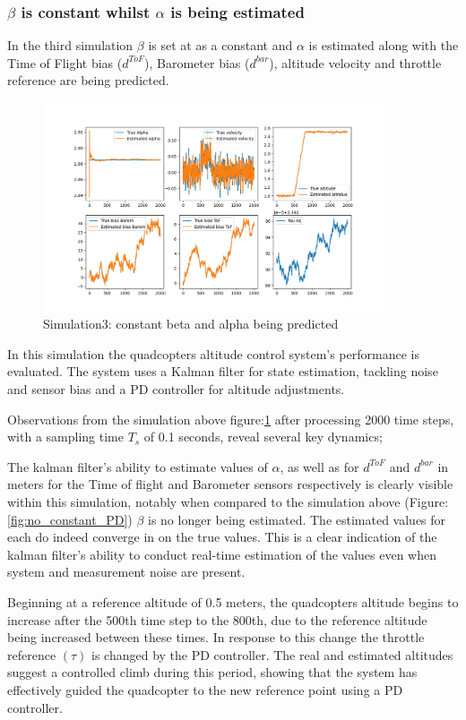 \documentclass{article}
\begin{document}
\subsubsection*{\(\beta\) is constant whilst \(\alpha\) is being estimated}
In the third simulation \(\beta\) is set at as a constant and \(\alpha\) is
estimated along with the Time of Flight bias (\(d^{ToF}\)), Barometer bias
(\(d^{bar}\)), altitude velocity and throttle reference are being predicted.
\begin{figure}[H]
  \centering
  \includegraphics[width=0.9\textwidth]{Pictures/b_constant_PD.png}
  \caption{Simulation3: constant beta and alpha being predicted}
  \label{fig:b_constant_PD}
\end{figure}
In this simulation the quadcopters altitude control system's performance is
evaluated. The system uses a Kalman filter for state estimation, tackling noise
and sensor bias and a PD controller for altitude adjustments.

Observations from the simulation above figure:\ref{fig:b_constant_PD} after
processing 2000 time steps, with a sampling time \(T_s\) of 0.1 seconds, reveal
several key dynamics;

The kalman filter’s ability to estimate values of \(\alpha\), as well as for
\(d^{ToF}\) and \(d^{bar}\) in meters for the Time of flight and Barometer
sensors respectively is clearly visible within this simulation, notably when
compared to the simulation above (Figure:\ref{fig:no_constant_PD}) \(\beta\) is
no longer being estimated. The estimated values for each do indeed converge in
on the true values. This is a clear indication of the kalman filter’s ability to
conduct real-time estimation of the values even when system and measurement
noise are present.

Beginning at a reference altitude of 0.5 meters, the quadcopters altitude begins
to increase after the 500th time step to the 800th, due to the reference
altitude being increased between these times. In response to this change the
throttle reference \((\tau)\) is changed by the PD controller. The real and
estimated altitudes suggest a controlled climb during this period, showing that
the system has effectively guided the quadcopter to the new reference point
using a PD controller.
\end{document}
